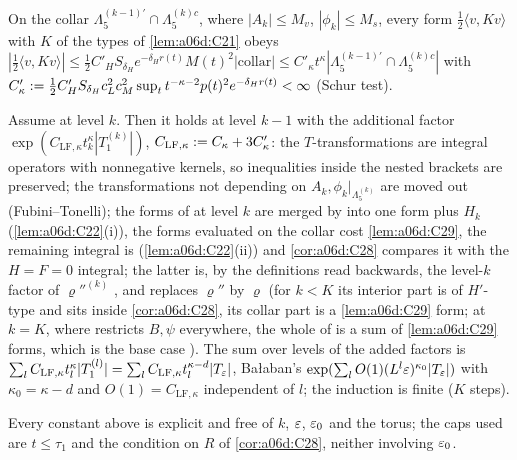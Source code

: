 \begin{lemma}\label{lem:a06d:C29}
On the collar $\Lambda^{(k-1)'}_5\cap\Lambda^{(k)c}_5$, where $|A_k|\le M_v$, $|\phi_k|\le M_s$, every form $\frac12\langle v,Kv\rangle$ with $K$ of the types of \cref{lem:a06d:C21} obeys $|\frac12\langle v,Kv\rangle|\le\frac12C'_HS_{\delta_H}e^{-\delta_Hr(t)}M(t)^2|\text{collar}|\le C'_\kappa t^\kappa|\Lambda^{(k-1)'}_5\cap\Lambda^{(k)c}_5|$ with $C'_\kappa:=\frac12C'_HS_{\delta_H}c_L^2c_M^2\sup_tt^{-\kappa-2}p(t)^2e^{-\delta_Hr(t)}<\infty$ (Schur test).
\end{lemma}

\begin{proposition}\label{prop:a06d:C211}
Assume \cite[(3.5)]{Ba2} at level $k$. Then it holds at level $k-1$ with the additional factor $\exp(C_{\mathrm{LF},\kappa}t_k^\kappa|T^{(k)}_1|)$, $C_{\mathrm{LF},\kappa}:= C_\kappa+3C'_\kappa$: the $T$-transformations are integral operators with nonnegative kernels, so inequalities inside the nested brackets are preserved; the transformations not depending on $A_k,\phi_k|_{\Lambda^{(k)}_5}$ are moved out (Fubini--Tonelli); the forms of \cite[(3.5)]{Ba2} at level $k$ are merged by \cite[(2.108)]{Ba2} into one form plus $H_k$ (\cref{lem:a06d:C22}(i)), the forms evaluated on the collar cost \cref{lem:a06d:C29}, the remaining integral is \cite[(3.9)]{Ba2} (\cref{lem:a06d:C22}(ii)) and \cref{cor:a06d:C28} compares it with the $H=F=0$ integral; the latter is, by the definitions \cite[(2.45)--(2.50)]{Ba2} read backwards, the level-$k$ factor of $\varrho''^{(k)}$ \cite[(2.46)]{Ba2}, and \cite[(2.48)]{Ba2} replaces $\varrho''$ by $\varrho$ (for $k<K$ its interior part is of $H'$-type and sits inside \cref{cor:a06d:C28}, its collar part is a \cref{lem:a06d:C29} form; at $k=K$, where \cite[p.~583]{Ba2} restricts $B,\psi$ everywhere, the whole of \cite[(2.48)]{Ba2} is a sum of \cref{lem:a06d:C29} forms, which is the base case \cite[(3.1)]{Ba2}). The sum over levels of the added factors is $\sum_lC_{\mathrm{LF},\kappa}t_l^\kappa|T^{(l)}_1|=\sum_lC_{\mathrm{LF},\kappa}t_l^{\kappa-d}|T_{\varepsilon}|$, Ba{\l}aban's $\exp(\sum_lO(1)(L^l\varepsilon)^{\kappa_0}|T_{\varepsilon}|)$ with $\kappa_0=\kappa-d$ and $O(1)=C_{\mathrm{LF},\kappa}$ independent of $l$; the induction is finite ($K$ steps).
\end{proposition}

Every constant above is explicit and free of $k$, $\varepsilon$, $\varepsilon_0$ and the torus; the caps used are $t\le\tau_1$ and the condition on $R$ of \cref{cor:a06d:C28}, neither involving $\varepsilon_0$.
